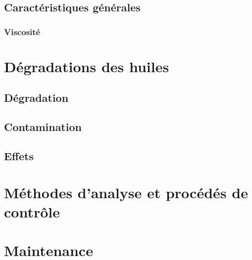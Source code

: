 \subsection{Caractéristiques générales}

\subsubsection{Viscosité}

\section{Dégradations des huiles}


\subsection{Dégradation}

\subsection{Contamination}

\subsection{Effets}


\section{Méthodes d'analyse et procédés de contrôle}


\section{Maintenance}




%

